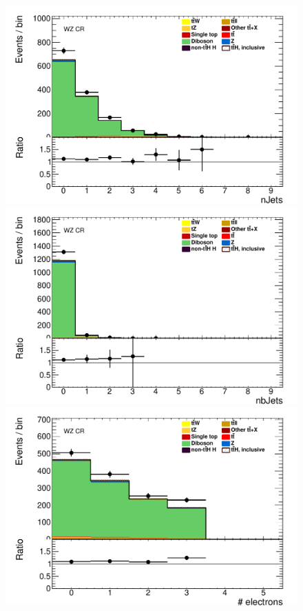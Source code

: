 \begin{figure}[!htbp]
  \begin{minipage}[h]{0.5\textwidth}
    \centering \includegraphics[width=\textwidth]{figs/WZ/standardCR_3l_WZ_MT_nJets_OR_thesis}
  \end{minipage}\hfill
  \begin{minipage}[h]{0.5\textwidth}
    \centering \includegraphics[width=\textwidth]{figs/WZ/standardCR_3l_WZ_MT_nJets_OR_MV1_70_thesis}
  \end{minipage}\hfill
  \begin{minipage}[h]{0.5\textwidth}
    \centering \includegraphics[width=\textwidth]{figs/WZ/standardCR_3l_WZ_MT_nelec_thesis}

\end{minipage}
\end{figure}
